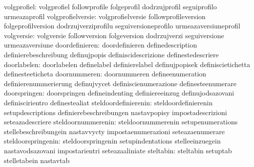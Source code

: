                      volgprofiel: volgprofiel                      followprofile
                                  folgeprofil                      dodrzujprofil
                                  seguiprofilo                     urmeazaprofil
               volgprofielversie: volgprofielversie                followprofileversion
                                  folgeprofilversion               dodrzujverziprofilu
                                  seguiversioneprofilo             urmeazaversiuneprofil
                      volgversie: volgversie                       followversion
                                  folgeversion                     dodrzujverzi
                                  seguiversione                    urmeazaversiune
                  doordefinieren: doordefinieren                   definedescription
                                  definierebeschreibung            definujpopis
                                  definiscidescrizione             definestedescriere
                     doorlabelen: doorlabelen                      definelabel
                                  definierelabel                   definujpopisek
                                  definiscietichetta               definesteeticheta
                    doornummeren: doornummeren                     defineenumeration
                                  definierenummerierung            definujvycet
                                  definiscienumerazione            definesteenumerare
                    doorspringen: doorspringen                     defineindenting
                                  definiereeinzug                  definujodsazovani
                                  definiscirientro                 definestealiat
            steldoordefinierenin: steldoordefinierenin             setupdescriptions
                                  definierebeschreibungen          nastavpopisy
                                  impostadescrizioni               seteazadescriere
              steldoornummerenin: steldoornummerenin               setupenumerations
                                  stellebeschreibungein            nastavvycty
                                  impostaenumerazioni              seteazaenumerare
              steldoorspringenin: steldoorspringenin               setupindentations
                                  stelleeinzuegein                 nastavodsazovani
                                  impostarientri                   seteazaaliniate
                       steltabin: steltabin                        setuptab
                                  stelletabein                     nastavtab
